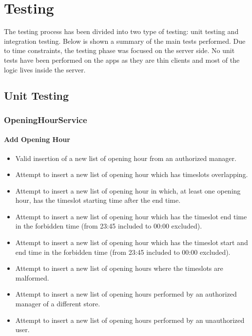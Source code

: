 \chapter{Testing}
The testing process has been divided into two type of testing: unit testing and integration testing. Below is shown a summary of the main tests performed.\newline
Due to time constraints, the testing phase was focused on the server side.\newline
No unit tests have been performed on the apps as they are thin clients and most of the logic lives inside the server. 

\section{Unit Testing}

\subsection{OpeningHourService}
\subsubsection{Add Opening Hour}
\begin{itemize}
	\item Valid insertion of a new list of opening hour from an authorized manager.
	\item Attempt to insert a new list of opening hour which has timeslots overlapping.
	\item  Attempt to insert a new list of opening hour in which, at least one opening hour, has the timeslot starting time after the end time.
	\item Attempt to insert a new list of opening hour which has the timeslot end time in the forbidden time (from 23:45 included to 00:00 excluded).
	\item Attempt to insert a new list of opening hour which has the timeslot start and end time in the forbidden time (from 23:45 included to 00:00 excluded).
	\item Attempt to insert a new list of opening hours where the timeslots are malformed.
	\item Attempt to insert a new list of opening hours performed by an authorized manager of a different store.
	\item Attempt to insert a new list of opening hours performed by an unauthorized user.
\end{itemize}

